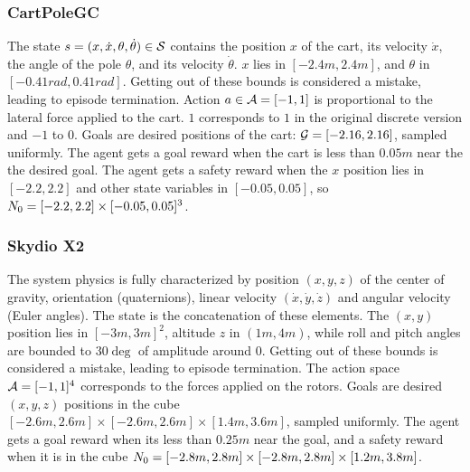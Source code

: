 \subsubsection{CartPoleGC}
The state $s = (x, \dot{x}, \theta, \dot{\theta}) \in \mathcal{S}$ contains the position $x$ of the cart, its velocity $\dot{x}$, the angle of the pole $\theta$, and its 
velocity $\dot{\theta}$. $x$ lies in $[-2.4m, 2.4m]$, and $\theta$ in $[-0.41rad, 0.41rad]$.
Getting out of these bounds is considered a mistake, leading to episode termination. 
Action $a \in \mathcal{A} = [-1, 1]$ is proportional to the lateral force applied to the cart. 
$1$ corresponds to $1$ in the original discrete version and $-1$ to $0$. 
Goals are desired positions of the cart: $\mathcal{G} = [-2.16, 2.16]$, sampled uniformly. 
The agent gets a goal reward when the cart is less than $0.05m$ near the the desired goal.
The agent gets a safety reward when the $x$ position lies in $[-2.2, 2.2]$ and other state variables in 
$[-0.05, 0.05]$, so $N_0 = [-2.2, 2.2] \times [-0.05, 0.05]^3$.

\subsubsection{Skydio X2}
The system physics is fully characterized by position $(x, y, z)$ of the center of gravity, orientation (quaternions),
linear velocity $(\dot{x}, \dot{y}, \dot{z})$ and angular velocity (Euler angles).
The state is the concatenation of these elements. The $(x, y)$ position lies in $[-3m, 3m]^2$, altitude $z$ in $(1m, 4m)$, 
while roll and pitch angles are bounded to $30 \deg$ of amplitude around $0$. 
Getting out of these bounds is considered a mistake, leading to episode termination. 
The action space $\mathcal{A} = [-1, 1]^4$ corresponds to the forces applied on the rotors.
Goals are desired $(x, y, z)$ positions in the cube $[-2.6m, 2.6m] \times [-2.6m, 2.6m] \times [1.4m, 3.6m]$,
sampled uniformly. The agent gets a goal reward when its less than $0.25m$ near the goal, and a safety reward when
it is in the cube $N_0 = [-2.8m, 2.8m] \times [-2.8m, 2.8m] \times [1.2m, 3.8m]$.


